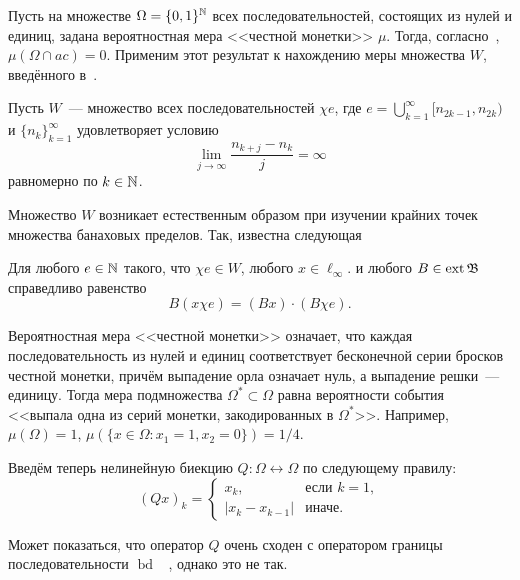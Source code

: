 Пусть на множестве $\Omega=\{0,1\}^{\mathbb{N}}$ всех последовательностей, состоящих из нулей и единиц,
задана вероятностная мера <<честной монетки>> $\mu$.
Тогда, согласно~\cite{connor1990almost}, $\mu(\Omega\cap ac)=0$.
Применим этот результат к нахождению меры множества $W$,
введённого в~\cite[\S 5]{Semenov2014geomprops}.

Пусть $W$~--- множество всех последовательностей $\chi e$, где $e =\bigcup_{k=1}^{\infty} [n_{2k-1}, n_{2k} )$
и $\{n_k \}_{k=1}^{\infty}$
удовлетворяет условию
\begin{equation}
	\label{eq:lim_j_n_kj_measure}
	\lim_{j\to\infty}\frac{n_{k+j} - n_k}{j} = \infty
\end{equation}
равномерно по $k \in \mathbb{N}$.

Множество $W$ возникает естественным образом при изучении крайних точек множества банаховых пределов.
Так, известна следующая
\begin{lemma}
	Для любого $e\in\mathbb{N}$ такого, что $\chi e \in W$,
	любого $x\in\ell_\infty$.
	и любого $B\in\operatorname{ext}\mathfrak{B}$
	справедливо равенство
	\begin{equation}
		B(x\chi e) = (Bx) \cdot (B\chi e)
		.
	\end{equation}
\end{lemma}


Вероятностная мера <<честной монетки>> означает,
что каждая последовательность из нулей и единиц соответствует бесконечной серии
бросков честной монетки, причём выпадение орла означает нуль, а выпадение решки~--- единицу.
Тогда мера подмножества $\Omega^*\subset\Omega$
равна вероятности события <<выпала одна из серий монетки, закодированных в $\Omega^*$>>.
Например, $\mu(\Omega)=1$, $\mu(\{x\in\Omega:x_1=1, x_2=0\})=1/4$.

Введём теперь нелинейную биекцию $Q:\Omega\leftrightarrow\Omega$ по следующему правилу:
\begin{equation}
	(Qx)_k = \begin{cases}
		x_k, &\mbox{если~} k = 1,
		\\
		|x_k-x_{k-1}|&\mbox{иначе}.
	\end{cases}
\end{equation}

\begin{remark}
	Может показаться, что оператор $Q$ очень сходен с оператором границы последовательности $\operatorname{bd}$
	~\cite{keller1992invariant},
	однако это не так.
\end{remark}

